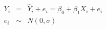 \begin{equation*}
	\begin{array}{lll}
		Y_i & =    & \hat{Y}_i + e_i = \beta_0 + \beta_1 X_i + e_i \\
		e_i & \sim & N(0,\sigma)                                   \\
	\end{array}
\end{equation*}
